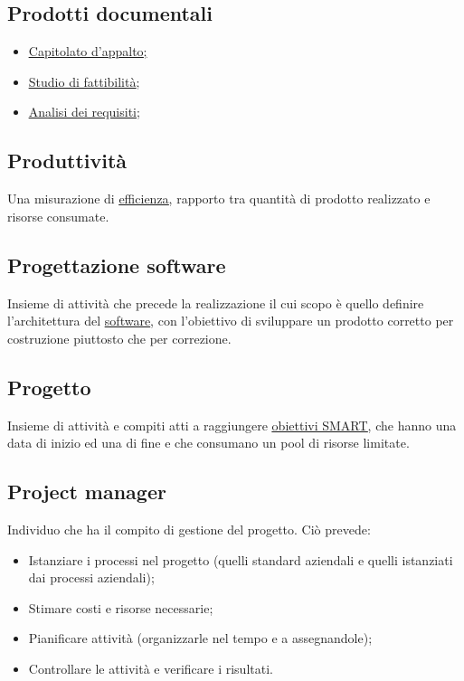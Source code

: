 	\subsection{Prodotti documentali}
	\label{sec:prodottidocumentali}
	\begin{itemize}
	\item \underline{\hyperref[sec:capitolato]{Capitolato d'appalto};}
	\item \underline{\hyperref[sec:studiofattibilita]{Studio di fattibilità}};
	\item \underline{\hyperref[sec:analisirequisiti]{Analisi dei requisiti}};
	\end{itemize}


	\subsection{Produttività}
	\label{sec:produttivita}
	Una misurazione di \underline{\hyperref[sec:efficienza]{efficienza}}, rapporto tra quantità di prodotto realizzato e risorse consumate.


	\subsection{Progettazione software}
	\label{sec:progettazionesoftware}
	Insieme di attività che precede la realizzazione il cui scopo è quello definire l'architettura del \underline{\hyperref[sec:prodottosoftware]{software}}, con l'obiettivo di sviluppare un prodotto corretto per costruzione piuttosto che per correzione.


	\subsection{Progetto}
	\label{sec:progetto}
	Insieme di attività e compiti atti a raggiungere \underline{\hyperref[sec:smart]{obiettivi SMART}}, che hanno una data di inizio ed una di fine e che consumano un pool di risorse limitate.


	\subsection{Project manager}
	\label{sec:projectmanager}
	Individuo che ha il compito di gestione del progetto. Ciò prevede:
	\begin{itemize}
	\item Istanziare i processi nel progetto (quelli standard aziendali e quelli istanziati dai processi aziendali);
	\item Stimare costi e risorse necessarie;
	\item Pianificare attività (organizzarle nel tempo e a assegnandole);
	\item Controllare le attività e verificare i risultati.
	\end{itemize}


